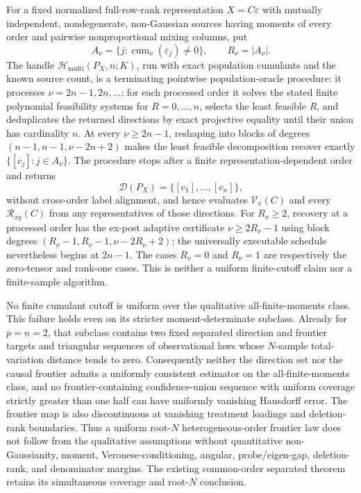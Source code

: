 For a fixed normalized full-row-rank representation \(X=C\varepsilon\) with mutually independent, nondegenerate, non-Gaussian sources having moments of every order and pairwise nonproportional mixing columns, put
\[
 A_\nu=\{j:\operatorname{cum}_\nu(\varepsilon_j)\ne0\},
 \qquad R_\nu=|A_\nu|.
\]
The handle \(\mathcal H_{\mathrm{multi}}(P_X,n;K)\), run with exact population cumulants and the known source count, is a terminating pointwise population-oracle procedure: it processes \(\nu=2n-1,2n,\ldots\); for each processed order it solves the stated finite polynomial feasibility systems for \(R=0,\ldots,n\), selects the least feasible \(R\), and deduplicates the returned directions by exact projective equality until their union has cardinality \(n\). At every \(\nu\ge2n-1\), reshaping into blocks of degrees \((n-1,n-1,\nu-2n+2)\) makes the least feasible decomposition recover exactly \(\{[c_j]:j\in A_\nu\}\). The procedure stops after a finite representation-dependent order and returns
\[
 \mathcal D(P_X)=\{[c_1],\ldots,[c_n]\},
\]
without cross-order label alignment, and hence evaluates \(\mathcal V_x(C)\) and every \(\mathcal R_{xy}(C)\) from any representatives of those directions. For \(R_\nu\ge2\), recovery at a processed order has the ex-post adaptive certificate \(\nu\ge2R_\nu-1\) using block degrees \((R_\nu-1,R_\nu-1,\nu-2R_\nu+2)\); the universally executable schedule nevertheless begins at \(2n-1\). The cases \(R_\nu=0\) and \(R_\nu=1\) are respectively the zero-tensor and rank-one cases. This is neither a uniform finite-cutoff claim nor a finite-sample algorithm.

No finite cumulant cutoff is uniform over the qualitative all-finite-moments class. This failure holds even on its stricter moment-determinate subclass. Already for \(p=n=2\), that subclass contains two fixed separated direction and frontier targets and triangular sequences of observational laws whose \(N\)-sample total-variation distance tends to zero. Consequently neither the direction set nor the causal frontier admits a uniformly consistent estimator on the all-finite-moments class, and no frontier-containing confidence-union sequence with uniform coverage strictly greater than one half can have uniformly vanishing Hausdorff error. The frontier map is also discontinuous at vanishing treatment loadings and deletion-rank boundaries. Thus a uniform root-\(N\) heterogeneous-order frontier law does not follow from the qualitative assumptions without quantitative non-Gaussianity, moment, Veronese-conditioning, angular, probe/eigen-gap, deletion-rank, and denominator margins. The existing common-order separated theorem retains its simultaneous coverage and root-\(N\) conclusion.